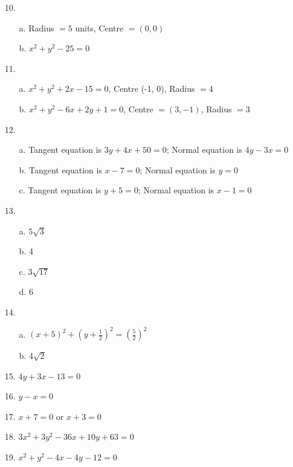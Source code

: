 \begin{enumerate}[leftmargin=*, widest=19]
\begin{enumerate}
\end{enumerate}
\item[10.]
\begin{enumerate}
  \item[a.] Radius $= 5$ units, Centre $= (0, 0)$
  \item[b.] $x^2 + y^2 - 25 = 0$
\end{enumerate}
\item[11.]
\begin{enumerate}
  \item[a.] $x^2 + y^2 + 2x - 15 = 0$, Centre (-1, 0), Radius $= 4$
  \item[b.] $x^2 + y^2 - 6x + 2y + 1 = 0$, Centre $= (3, -1)$, Radius $= 3$
\end{enumerate}
\item[12.]
\begin{enumerate}
  \item[a.] Tangent equation is $3y + 4x + 50 = 0$; Normal equation is
  $4y - 3x = 0$
  \item[b.] Tangent equation is $x - 7 = 0$; Normal equation is $y = 0$
  \item[c.] Tangent equation is $y + 5 = 0$; Normal equation is $x - 1 = 0$
\end{enumerate}
\item[13.]
\begin{enumerate}
  \item[a.] $5\sqrt{3}$
  \item[b.] 4
  \item[c.] $3\sqrt{17}$
  \item[d.] 6
\end{enumerate}
\item[14.]
\begin{enumerate}
  \item[a.] $\left(x + 5\right)^2 + \left(y + \frac{1}{2}\right)^2 = \left(\frac{5}{2}\right)^2$
  \item[b.] $4\sqrt{2}$
\end{enumerate}
\item[15.] $4y + 3x - 13 = 0$
\item[16.] $y - x = 0$
\item[17.] $x + 7 = 0$ or $x + 3 = 0$
\item[18.] $3x^2 + 3y^2 - 36x + 10y + 63 = 0$
\item[19.] $x^2 + y^2 - 4x - 4y - 12 = 0$
\end{enumerate}
